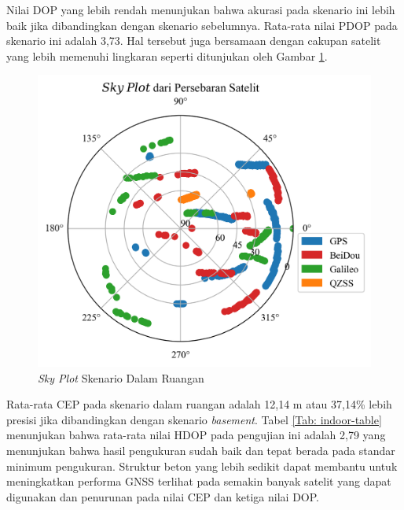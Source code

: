 Nilai DOP yang lebih rendah menunjukan bahwa akurasi pada skenario ini lebih baik jika dibandingkan dengan skenario sebelumnya. Rata-rata nilai PDOP pada skenario ini adalah 3,73. Hal tersebut juga bersamaan dengan cakupan satelit yang lebih memenuhi lingkaran seperti ditunjukan oleh Gambar \ref{Fig: indoor-sky_plot}.

\begin{figure}[H]
	\centering
	\captionsetup{justification=centering}
	\includegraphics[width=12cm]{contents/chapter-4/2-skenario-indoor/sky_plot.png}
	\caption{\textit{Sky Plot} Skenario Dalam Ruangan}
	\label{Fig: indoor-sky_plot}
\end{figure}

Rata-rata CEP pada skenario dalam ruangan adalah 12,14 m atau 37,14\% lebih presisi jika dibandingkan dengan skenario \textit{basement}. Tabel \ref{Tab: indoor-table} menunjukan bahwa rata-rata nilai HDOP pada pengujian ini adalah 2,79 yang menunjukan bahwa hasil pengukuran sudah baik dan tepat berada pada standar minimum pengukuran. Struktur beton yang lebih sedikit dapat membantu untuk meningkatkan performa GNSS terlihat pada semakin banyak satelit yang dapat digunakan dan penurunan pada nilai CEP dan ketiga nilai DOP.

